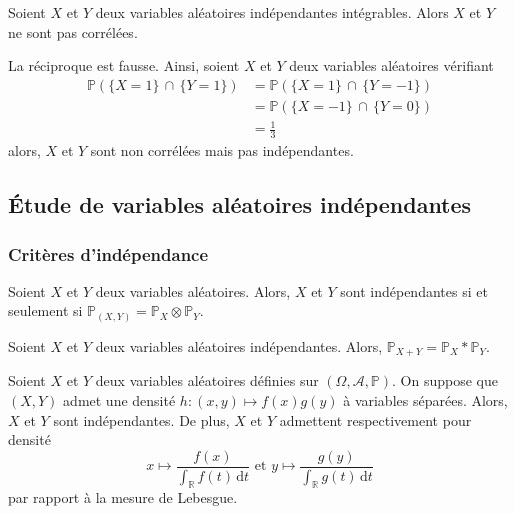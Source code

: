 	\begin{proposition}
		Soient $X$ et $Y$ deux variables aléatoires indépendantes intégrables. Alors $X$ et $Y$ ne sont pas corrélées.
	\end{proposition}
	
	\begin{cexample}
		La réciproque est fausse. Ainsi, soient $X$ et $Y$ deux variables aléatoires vérifiant
		\begin{align*}
			\mathbb{P}(\{ X = 1 \} \, \cap \, \{ Y = 1 \}) &= \mathbb{P}(\{ X = 1 \} \, \cap \, \{ Y = -1 \}) \\
			&= \mathbb{P}(\{ X = -1 \} \, \cap \, \{ Y = 0 \}) \\
			&= \frac{1}{3}
		\end{align*}
		alors, $X$ et $Y$ sont non corrélées mais pas indépendantes.
	\end{cexample}
	
	\subsection{Étude de variables aléatoires indépendantes}
	
	\subsubsection{Critères d'indépendance}
	
	
	\begin{theorem}
		Soient $X$ et $Y$ deux variables aléatoires. Alors, $X$ et $Y$ sont indépendantes si et seulement si $\mathbb{P}_{(X,Y)} = \mathbb{P}_X \otimes \mathbb{P}_Y$.
	\end{theorem}
	
	\begin{corollary}
		Soient $X$ et $Y$ deux variables aléatoires indépendantes. Alors, $\mathbb{P}_{X+Y} = \mathbb{P}_X * \mathbb{P}_Y$.
	\end{corollary}
	
	
	\begin{proposition}
		Soient $X$ et $Y$ deux variables aléatoires définies sur $(\Omega, \mathcal{A}, \mathbb{P})$. On suppose que $(X,Y)$ admet une densité $h : (x,y) \mapsto f(x) g(y)$ à variables séparées. Alors, $X$ et $Y$ sont indépendantes. De plus, $X$ et $Y$ admettent respectivement pour densité
		\[ x \mapsto \frac{f(x)}{\int_{\mathbb{R}} f(t) \, \mathrm{d}t} \text{ et } y \mapsto \frac{g(y)}{\int_{\mathbb{R}} g(t) \, \mathrm{d}t} \]
		par rapport à la mesure de Lebesgue.
	\end{proposition}
	
